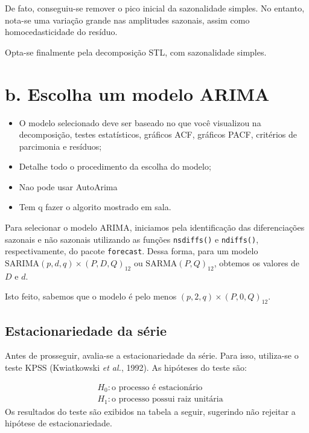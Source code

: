 \documentclass[
  letterpaper,
  DIV=11,
  numbers=noendperiod]{scrartcl}
\providecommand{\tightlist}{%
  \setlength{\itemsep}{0pt}\setlength{\parskip}{0pt}}\usepackage{longtable,booktabs,array}
\begin{document}
De fato, conseguiu-se remover o pico inicial da sazonalidade simples. No
entanto, nota-se uma variação grande nas amplitudes sazonais, assim como
homocedasticidade do resíduo.

Opta-se finalmente pela decomposição STL, com sazonalidade simples.

\hypertarget{b.-escolha-um-modelo-arima}{%
\section{b. Escolha um modelo ARIMA}\label{b.-escolha-um-modelo-arima}}

\begin{itemize}
\tightlist
\item
  O modelo selecionado deve ser baseado no que você visualizou na
  decomposição, testes estatísticos, gráficos ACF, gráficos PACF,
  critérios de parcimonia e resíduos;
\item
  Detalhe todo o procedimento da escolha do modelo;
\item
  Nao pode usar AutoArima
\item
  Tem q fazer o algorito mostrado em sala.
\end{itemize}

Para selecionar o modelo ARIMA, iniciamos pela identificação das
diferenciações sazonais e não sazonais utilizando as funções
\texttt{nsdiffs()} e \texttt{ndiffs()}, respectivamente, do pacote
\texttt{forecast}. Dessa forma, para um modelo
\(\text{SARIMA}(p,d,q)\times(P,D,Q)_{12}\) ou
\(\text{SARMA}(P,Q)_{12}\), obtemos os valores de \(D\) e \(d\).

Isto feito, sabemos que o modelo é pelo menos
\((p,2,q)\times(P,0,Q)_{12}\).

\hypertarget{estacionariedade-da-suxe9rie}{%
\subsection{Estacionariedade da
série}\label{estacionariedade-da-suxe9rie}}

Antes de prosseguir, avalia-se a estacionariedade da série. Para isso,
utiliza-se o teste KPSS (Kwiatkowski \emph{et al.}, 1992). As hipóteses
do teste são:

\[
\begin{aligned}
  &H_0: \text{o processo é estacionário} \\
  &H_1: \text{o processo possui raiz unitária}
\end{aligned}
\] Os resultados do teste são exibidos na tabela a seguir, sugerindo não
rejeitar a hipótese de estacionariedade.
\end{document}
